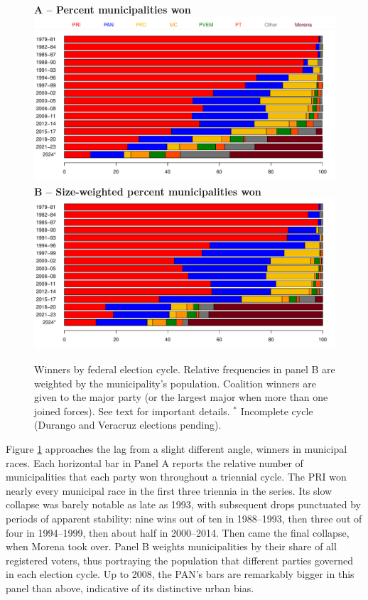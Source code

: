 \documentclass[letter,12pt]{article}
\begin{document}
\begin{figure}
  \centering
  \textbf{A -- Percent municipalities won} \\
  \includegraphics[width=.9\columnwidth]{../../plots/pctwin1979-2024-legend.pdf} \\
  \includegraphics[width=.9\columnwidth]{../../plots/pctwin1979-2024.pdf} \\
  \textbf{B -- Size-weighted percent municipalities won} \\
  \includegraphics[width=.9\columnwidth]{../../plots/pctwin-popw1979-2024.pdf}
  \caption{Winners by federal election cycle. Relative frequencies in panel B are weighted by the municipality's population. Coalition winners are given to the major party (or the largest major when more than one joined forces). See text for important details. $^*$ Incomplete cycle (Durango and Veracruz elections pending).}\label{F:win}
\end{figure}  

Figure \ref{F:win} approaches the lag from a slight different angle, winners in municipal races. Each horizontal bar in Panel A reports the relative number of municipalities that each party won throughout a triennial cycle. The PRI won nearly every municipal race in the first three triennia in the series. Its slow collapse was barely notable as late as 1993, with subsequent drops punctuated by periods of apparent stability: nine wins out of ten in 1988--1993, then three out of four in 1994--1999, then about half in 2000--2014. Then came the final collapse, when Morena took over. Panel B weights municipalities by their share of all registered voters, thus portraying the population that different parties governed in each election cycle. Up to 2008, the PAN's bars are remarkably bigger in this panel than above, indicative of its distinctive urban bias. 
\end{document}
